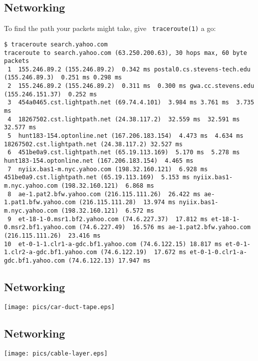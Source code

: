 \documentclass[xga]{xdvislides}
\begin{document}
\subsection{Networking}
To find the path your packets might take, give {\tt
traceroute(1)} a go: \\

\begin{verbatim}
$ traceroute search.yahoo.com
traceroute to search.yahoo.com (63.250.200.63), 30 hops max, 60 byte packets
 1  155.246.89.2 (155.246.89.2)  0.342 ms postal0.cs.stevens-tech.edu (155.246.89.3)  0.251 ms 0.298 ms
 2  155.246.89.2 (155.246.89.2)  0.311 ms  0.300 ms gwa.cc.stevens.edu (155.246.151.37)  0.252 ms
 3  454a0465.cst.lightpath.net (69.74.4.101)  3.984 ms 3.761 ms  3.735 ms
 4  18267502.cst.lightpath.net (24.38.117.2)  32.559 ms  32.591 ms  32.577 ms
 5  hunt183-154.optonline.net (167.206.183.154)  4.473 ms  4.634 ms 18267502.cst.lightpath.net (24.38.117.2) 32.527 ms
 6  451be0a9.cst.lightpath.net (65.19.113.169)  5.170 ms  5.278 ms hunt183-154.optonline.net (167.206.183.154)  4.465 ms
 7  nyiix.bas1-m.nyc.yahoo.com (198.32.160.121)  6.928 ms 451be0a9.cst.lightpath.net (65.19.113.169)  5.153 ms nyiix.bas1-m.nyc.yahoo.com (198.32.160.121)  6.868 ms
 8  ae-1.pat2.bfw.yahoo.com (216.115.111.26)  26.422 ms ae-1.pat1.bfw.yahoo.com (216.115.111.28)  13.974 ms nyiix.bas1-m.nyc.yahoo.com (198.32.160.121)  6.572 ms
 9  et-18-1-0.msr1.bf2.yahoo.com (74.6.227.37)  17.812 ms et-18-1-0.msr2.bf1.yahoo.com (74.6.227.49)  16.576 ms ae-1.pat2.bfw.yahoo.com (216.115.111.26)  23.416 ms
10  et-0-1-1.clr1-a-gdc.bf1.yahoo.com (74.6.122.15) 18.817 ms et-0-1-1.clr2-a-gdc.bf1.yahoo.com (74.6.122.19)  17.672 ms et-0-1-0.clr1-a-gdc.bf1.yahoo.com (74.6.122.13) 17.947 ms
\end{verbatim}

\subsection{Networking}
\vspace*{\fill}
\begin{center}
	\texttt{[image: pics/car-duct-tape.eps]} \\
\end{center}
\vspace*{\fill}

\subsection{Networking}
\vspace*{\fill}
\begin{center}
	\texttt{[image: pics/cable-layer.eps]} \\
\end{center}
\vspace*{\fill}
\end{document}
